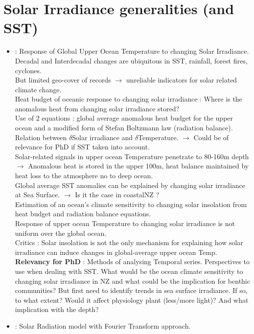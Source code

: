 \documentclass[]{report}
\begin{document}
	\section{Solar Irradiance generalities (and SST)}
\begin{itemize}
	\item \cite{white1997response} : Response of Global Upper Ocean Temperature to changing Solar Irradiance.
	\\ Decadal and Interdecadal changes are ubiquitous in SST, rainfall, forest fires, cyclones.
	\\ But limited geo-cover of records $\rightarrow$ unreliable indicators for solar related climate change.
	\\ Heat budget of oceanic response to changing solar irradiance : Where is the anomalous heat from changing solar irradiance stored?
	\\ Use of 2 equations : global average anomalous heat budget for the upper ocean and a modified form of Stefan Boltzmann law (radiation balance). Relation between $\delta$Solar irradiance and $\delta$Temperature. $\rightarrow$ Could be of relevance for PhD if SST taken into account.
	\\ Solar-related signals in upper ocean Temperature penetrate to 80-160m depth $\rightarrow$ Anomalous heat is stored in the upper 100m, heat balance maintained by heat loss to the atmosphere no to deep ocean.
	\\Global average SST anomalies can be explained by changing solar irradiance at Sea Surface. $\rightarrow$ Is it the case in coastalNZ ?
	\\ Estimation of an ocean's climate sensitivity to changing solar insolation from heat budget and radiation balance equations.
	\\ Response of upper ocean Temperature to changing solar irradiance is not uniform over the global ocean.
	\\Critics : Solar insolation is not the only mechanism for explaining how solar irradiance can induce changes in global-average upper ocean Temp.
	\\\textbf{Relevancy for PhD} : Methods of analysing Temporal series. Perspectives to use when dealing with SST. What would be the ocean climate sensitivity to changing solar irradiance in NZ and what could be the implication for benthic communities? But first need to identify trends in sea surface irradiance. If so, to what extent? Would it affect physiology plant (less/more light)? And what implication with the depth?
	\item \cite{sun2007solar} : Solar Radiation model with Fourier Transform approach.

\end{itemize}
\end{document}
